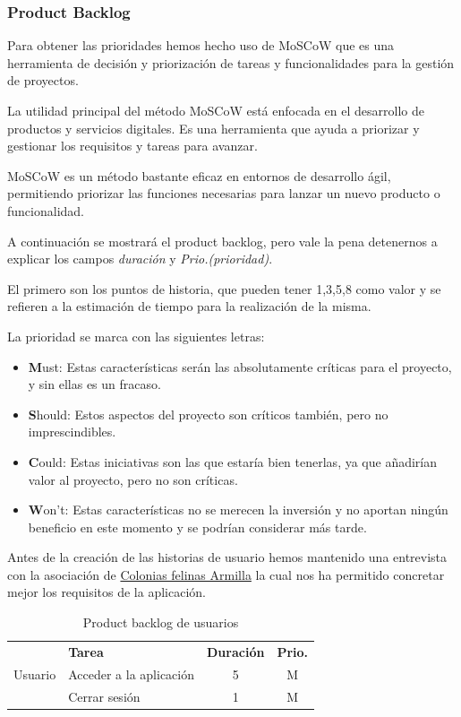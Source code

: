 \subsubsection{Product Backlog}
Para obtener las prioridades hemos hecho uso de MoSCoW \cite{moscow} que es una herramienta de decisión y priorización de tareas y funcionalidades para la gestión de proyectos.

La utilidad principal del método MoSCoW está enfocada en el desarrollo de productos y servicios digitales. Es una herramienta que ayuda a priorizar y gestionar los requisitos y tareas para avanzar.

MoSCoW es un método bastante eficaz en entornos de desarrollo ágil, permitiendo priorizar las funciones necesarias para lanzar un nuevo producto o funcionalidad.

A continuación se mostrará el product backlog, pero vale la pena detenernos a explicar los campos \textit{duración} y \textit{Prio.(prioridad)}.

El primero son los puntos de historia, que pueden tener 1,3,5,8 como valor y se refieren a la estimación de tiempo para la realización de la misma.

La prioridad se marca con las siguientes letras:
\begin{itemize}
	\item  \textbf{M}ust: Estas características serán las absolutamente críticas para el proyecto, y sin ellas es un fracaso.
	\item \textbf{S}hould: Estos aspectos del proyecto son críticos también, pero no imprescindibles.
	\item \textbf{C}ould: Estas iniciativas son las que estaría bien tenerlas, ya que añadirían valor al proyecto, pero no son críticas.
	\item \textbf{W}on't: Estas características no se merecen la inversión y no aportan ningún beneficio en este momento y se podrían considerar más tarde.
\end{itemize}

Antes de la creación de las historias de usuario hemos mantenido una entrevista con la asociación de \href{https://www.instagram.com/coloniasfelinasarmilla/}{Colonias felinas Armilla} la cual nos ha permitido concretar mejor los requisitos de la aplicación.

\begin{table}[H]
	\centering
	\begin{tabular}{|c |p{8cm}|c |c|} \hline 
		\multirow[c]{3}{*}{Usuario}&  \textbf{Tarea}&  \textbf{Duración}& \textbf{Prio.}\\  \cline{2-4}%
		&  Acceder a la aplicación&  5& M\\ \cline{2-4} 
		&  Cerrar sesión&  1& M\\ \hline 
	\end{tabular}
	\caption{Product backlog de usuarios}
	\label{tab:pb_usuarios}
\end{table}

